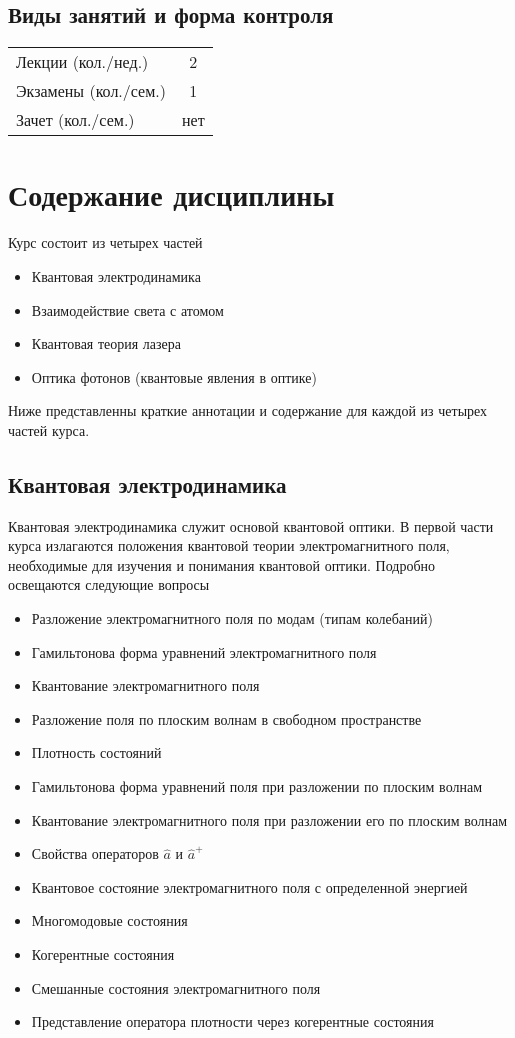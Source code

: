 \subsection{Виды занятий и форма контроля}
\begin{longtable}{|l|c|}
\hline
Лекции (кол./нед.) & 2 \\ 
Экзамены (кол./сем.)& 1 \\
Зачет (кол./сем.)& нет \\ \hline
\end{longtable}

\section{Содержание дисциплины}
Курс состоит из четырех частей
\begin{itemize}
\item Квантовая электродинамика
\item Взаимодействие света с атомом
\item Квантовая теория лазера
\item Оптика фотонов (квантовые явления в оптике)
\end{itemize}

Ниже представленны краткие аннотации и содержание для каждой из
четырех частей курса.

\subsection{Квантовая электродинамика}
Квантовая электродинамика служит основой квантовой оптики. В первой
части курса излагаются положения квантовой теории электромагнитного поля,
необходимые для изучения и понимания квантовой оптики. Подробно
освещаются следующие вопросы
\begin{itemize}
\item Разложение электромагнитного поля по модам (типам колебаний)
\item Гамильтонова форма уравнений электромагнитного поля 
\item Квантование электромагнитного поля 
\item Разложение поля по плоским волнам в свободном пространстве 
\item Плотность состояний 
\item Гамильтонова форма уравнений поля при разложении по плоским
  волнам 
\item Квантование электромагнитного поля при разложении его по
  плоским волнам 
\item Свойства операторов $ \hat a $ и $ \hat a ^+ $ 
\item Квантовое состояние электромагнитного поля  с определенной
  энергией 
\item Многомодовые состояния 
\item Когерентные состояния 
\item Смешанные состояния электромагнитного поля 
\item Представление оператора плотности через когерентные
  состояния 
\end{itemize}


